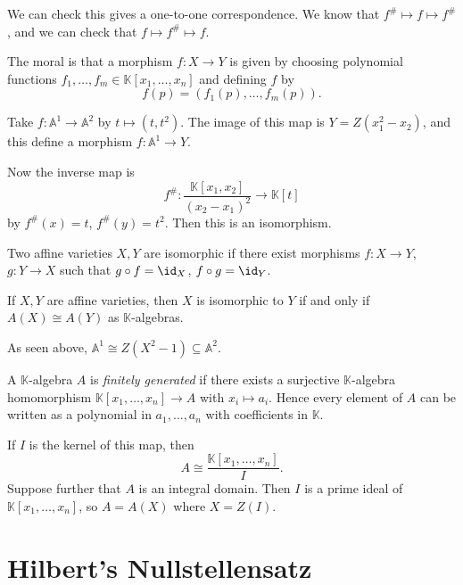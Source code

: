 \documentclass[12pt]{article}
\begin{document}
We can check this gives a one-to-one correspondence. We know that $f^{\#} \mapsto f \mapsto f^{\#}$, and we can check that $f \mapsto f^{\#} \mapsto f$.

The moral is that a morphism $f : X \to Y$ is given by choosing polynomial functions $f_1, \ldots, f_m \in \mathbb{K}[x_1, \ldots, x_n]$ and defining $f$ by
\[
f(p) = (f_1(p), \ldots, f_m(p)).
\]

\begin{exbox}
	Take $f : \mathbb{A}^1 \to \mathbb{A}^2$ by $t \mapsto (t, t^2)$. The image of this map is $Y = Z(x_1^2 - x_2)$, and this define a morphism $f : \mathbb{A}^1 \to Y$.

	Now the inverse map is
	\[
		f^{\#} : \frac{\mathbb{K}[x_1, x_2]}{(x_2 - x_1)^2} \to \mathbb{K}[t]
	\]
	by $f^{\#}(x) = t$, $f^{\#}(y) = t^2$. Then this is an isomorphism.
\end{exbox}

\begin{definition}
	Two affine varieties $X, Y$ are isomorphic if there exist morphisms $f : X \to Y$, $g : Y \to X$ such that $g \circ f = \id_X$, $f \circ g = \id_Y$.
\end{definition}

\begin{theorem}
	If $X, Y$ are affine varieties, then $X$ is isomorphic to $Y$ if and only if $A(X) \cong A(Y)$ as $\mathbb{K}$-algebras.
\end{theorem}

As seen above, $\mathbb{A}^1 \cong Z(X^2 - 1) \subseteq \mathbb{A}^2$.

\begin{remark}
	A $\mathbb{K}$-algebra $A$ is \emph{finitely generated} if there exists a surjective $\mathbb{K}$-algebra homomorphism $\mathbb{K}[x_1, \ldots, x_n] \to A$ with $x_i \mapsto a_i$. Hence every element of $A$ can be written as a polynomial in $a_1, \ldots, a_n$ with coefficients in $\mathbb{K}$.

	If $I$ is the kernel of this map, then
	\[
		A \cong \frac{\mathbb{K}[x_1, \ldots, x_n]}{I}.
	\]
	Suppose further that $A$ is an integral domain. Then $I$ is a prime ideal of $\mathbb{K}[x_1, \ldots, x_n]$, so $A = A(X)$ where $X = Z(I)$.
\end{remark}

\newpage

\section{Hilbert's Nullstellensatz}
\label{sec:hil_null}
\end{document}
